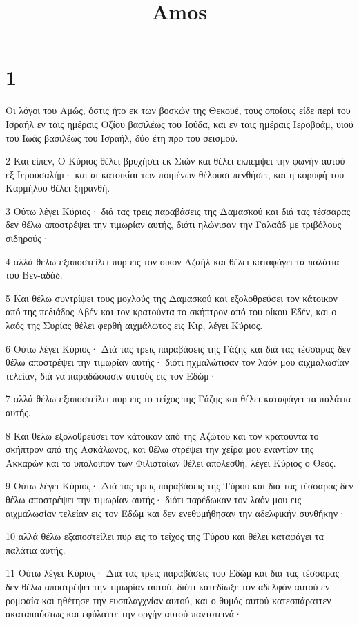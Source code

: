

\title{Amos}


\chapter{1}

\par Οι λόγοι του Αμώς, όστις ήτο εκ των βοσκών της Θεκουέ, τους οποίους είδε περί του Ισραήλ εν ταις ημέραις Οζίου βασιλέως του Ιούδα, και εν ταις ημέραις Ιεροβοάμ, υιού του Ιωάς βασιλέως του Ισραήλ, δύο έτη προ του σεισμού.
\par 2 Και είπεν, Ο Κύριος θέλει βρυχήσει εκ Σιών και θέλει εκπέμψει την φωνήν αυτού εξ Ιερουσαλήμ· και αι κατοικίαι των ποιμένων θέλουσι πενθήσει, και η κορυφή του Καρμήλου θέλει ξηρανθή.
\par 3 Ούτω λέγει Κύριος· διά τας τρεις παραβάσεις της Δαμασκού και διά τας τέσσαρας δεν θέλω αποστρέψει την τιμωρίαν αυτής, διότι ηλώνισαν την Γαλαάδ με τριβόλους σιδηρούς·
\par 4 αλλά θέλω εξαποστείλει πυρ εις τον οίκον Αζαήλ και θέλει καταφάγει τα παλάτια του Βεν-αδάδ.
\par 5 Και θέλω συντρίψει τους μοχλούς της Δαμασκού και εξολοθρεύσει τον κάτοικον από της πεδιάδος Αβέν και τον κρατούντα το σκήπτρον από του οίκου Εδέν, και ο λαός της Συρίας θέλει φερθή αιχμάλωτος εις Κιρ, λέγει Κύριος.
\par 6 Ούτω λέγει Κύριος· Διά τας τρεις παραβάσεις της Γάζης και διά τας τέσσαρας δεν θέλω αποστρέψει την τιμωρίαν αυτής· διότι ηχμαλώτισαν τον λαόν μου αιχμαλωσίαν τελείαν, διά να παραδώσωσιν αυτούς εις τον Εδώμ·
\par 7 αλλά θέλω εξαποστείλει πυρ εις το τείχος της Γάζης και θέλει καταφάγει τα παλάτια αυτής.
\par 8 Και θέλω εξολοθρεύσει τον κάτοικον από της Αζώτου και τον κρατούντα το σκήπτρον από της Ασκάλωνος, και θέλω στρέψει την χείρα μου εναντίον της Ακκαρών και το υπόλοιπον των Φιλισταίων θέλει απολεσθή, λέγει Κύριος ο Θεός.
\par 9 Ούτω λέγει Κύριος· Διά τας τρεις παραβάσεις της Τύρου και διά τας τέσσαρας δεν θέλω αποστρέψει την τιμωρίαν αυτής· διότι παρέδωκαν τον λαόν μου εις αιχμαλωσίαν τελείαν εις τον Εδώμ και δεν ενεθυμήθησαν την αδελφικήν συνθήκην·
\par 10 αλλά θέλω εξαποστείλει πυρ εις το τείχος της Τύρου και θέλει καταφάγει τα παλάτια αυτής.
\par 11 Ούτω λέγει Κύριος· Διά τας τρεις παραβάσεις του Εδώμ και διά τας τέσσαρας δεν θέλω αποστρέψει την τιμωρίαν αυτού, διότι κατεδίωξε τον αδελφόν αυτού εν ρομφαία και ηθέτησε την ευσπλαγχνίαν αυτού, και ο θυμός αυτού κατεσπάραττεν ακαταπαύστως και εφύλαττε την οργήν αυτού παντοτεινά·
